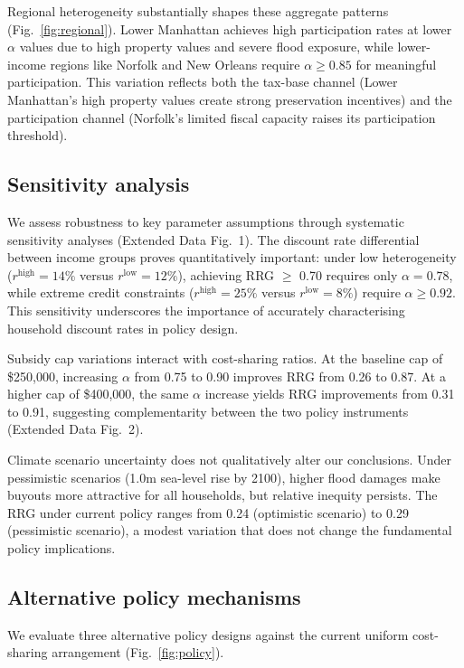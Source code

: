 \documentclass[11pt,letterpaper]{article}
\theoremstyle{definition}
\begin{document}
Regional heterogeneity substantially shapes these aggregate patterns (Fig.~\ref{fig:regional}). Lower Manhattan achieves high participation rates at lower $\alpha$ values due to high property values and severe flood exposure, while lower-income regions like Norfolk and New Orleans require $\alpha \geq 0.85$ for meaningful participation. This variation reflects both the tax-base channel (Lower Manhattan's high property values create strong preservation incentives) and the participation channel (Norfolk's limited fiscal capacity raises its participation threshold).

\subsection*{Sensitivity analysis}

We assess robustness to key parameter assumptions through systematic sensitivity analyses (Extended Data Fig.~1). The discount rate differential between income groups proves quantitatively important: under low heterogeneity ($r^{\text{high}} = 14\%$ versus $r^{\text{low}} = 12\%$), achieving RRG $\geq$ 0.70 requires only $\alpha = 0.78$, while extreme credit constraints ($r^{\text{high}} = 25\%$ versus $r^{\text{low}} = 8\%$) require $\alpha \geq 0.92$. This sensitivity underscores the importance of accurately characterising household discount rates in policy design.

Subsidy cap variations interact with cost-sharing ratios. At the baseline cap of \$250,000, increasing $\alpha$ from 0.75 to 0.90 improves RRG from 0.26 to 0.87. At a higher cap of \$400,000, the same $\alpha$ increase yields RRG improvements from 0.31 to 0.91, suggesting complementarity between the two policy instruments (Extended Data Fig.~2).

Climate scenario uncertainty does not qualitatively alter our conclusions. Under pessimistic scenarios (1.0m sea-level rise by 2100), higher flood damages make buyouts more attractive for all households, but relative inequity persists. The RRG under current policy ranges from 0.24 (optimistic scenario) to 0.29 (pessimistic scenario), a modest variation that does not change the fundamental policy implications.

\subsection*{Alternative policy mechanisms}

We evaluate three alternative policy designs against the current uniform cost-sharing arrangement (Fig.~\ref{fig:policy}).
\end{document}
